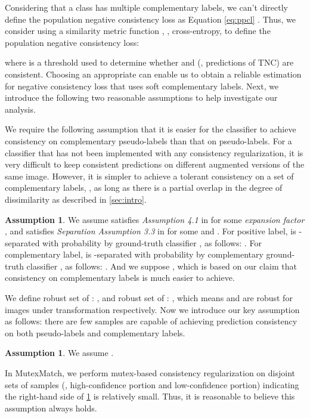 \documentclass[lettersize,journal]{IEEEtran}
\theoremstyle{plain}
\theoremstyle{definition}
\newtheorem{assumption}[theorem]{Assumption}
\theoremstyle{remark}
\begin{document}
Considering that a class has multiple complementary labels, we can't directly define the population negative  consistency loss as Equation \eqref{eq:ppcl} . Thus, 
we consider using a similarity metric function 
, \eg, cross-entropy, 
to define the population negative  consistency loss:

where  is a threshold used to determine whether  and  (\ie, predictions of TNC) are consistent. Choosing an appropriate   can enable us to obtain a reliable estimation for negative consistency loss  that uses soft complementary labels. 
Next, we introduce the following two reasonable assumptions to help investigate our analysis.

We require the following assumption that it is easier for the classifier to achieve consistency on complementary pseudo-labels than that on pseudo-labels. For a classifier that has not been implemented with any consistency regularization, it is very difficult to keep consistent predictions on different augmented versions of the same image. However,  it is simpler to achieve a tolerant consistency on a set of complementary labels, \ie, as long as there is  a partial overlap in the degree of dissimilarity as described in \cref{sec:intro}.
\begin{assumption}
We assume   satisfies \textit{Assumption 4.1} in \cite{wei2020theoretical} for some \textit{expansion factor} , and satisfies \textit{Separation Assumption 3.3} in \cite{wei2020theoretical} for some  and . For positive label,   is -separated with probability  by ground-truth classifier , as follows: .  For complementary label,   is -separated with probability  by complementary ground-truth classifier , as follows: . And we suppose  , which is based on our claim that consistency on  complementary labels is much easier to achieve.
\label{ass:sep}
\end{assumption}

We define robust set of : , and robust set of :   , which means  and  are robust for images under transformation  respectively. Now we introduce our key assumption as follows: there are few samples are capable of achieving prediction consistency on both pseudo-labels and complementary labels. 
\begin{assumption}
We assume  .
\label{ass:set}
\end{assumption}
In MutexMatch, we perform mutex-based consistency regularization on disjoint sets of samples (\ie, high-confidence portion and low-confidence portion) indicating the right-hand side of \cref{ass:set} is relatively small. Thus, it is reasonable to believe this assumption always holds.
\end{document}
